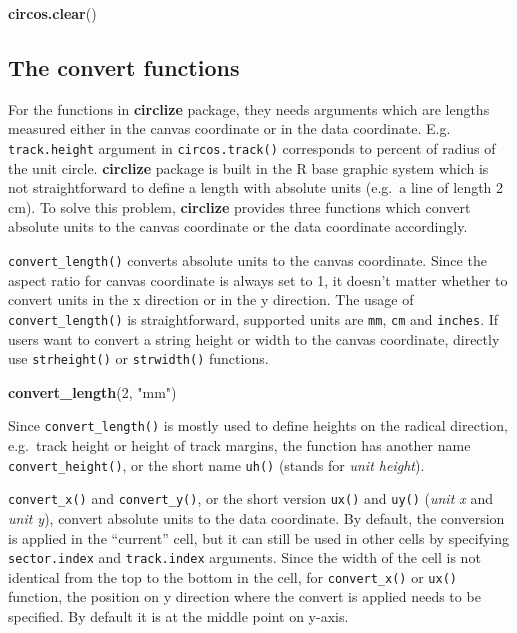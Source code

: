 \documentclass[]{book}
\newenvironment{Shaded}{\begin{snugshade}}{\end{snugshade}}
\newcommand{\KeywordTok}[1]{\textcolor[rgb]{0.13,0.29,0.53}{\textbf{#1}}}
\newcommand{\DecValTok}[1]{\textcolor[rgb]{0.00,0.00,0.81}{#1}}
\newcommand{\StringTok}[1]{\textcolor[rgb]{0.31,0.60,0.02}{#1}}
\newcommand{\NormalTok}[1]{#1}
\theoremstyle{definition}
\theoremstyle{definition}
\theoremstyle{remark}
\begin{document}
\begin{Shaded}
\begin{Highlighting}[]
\KeywordTok{circos.clear}\NormalTok{()}
\end{Highlighting}
\end{Shaded}

\subsection{The convert functions}\label{convert-functions}

For the functions in \textbf{circlize} package, they needs arguments
which are lengths measured either in the canvas coordinate or in the
data coordinate. E.g. \texttt{track.height} argument in
\texttt{circos.track()} corresponds to percent of radius of the unit
circle. \textbf{circlize} package is built in the R base graphic system
which is not straightforward to define a length with absolute units
(e.g.~a line of length 2 cm). To solve this problem, \textbf{circlize}
provides three functions which convert absolute units to the canvas
coordinate or the data coordinate accordingly.

\texttt{convert\_length()} converts absolute units to the canvas
coordinate. Since the aspect ratio for canvas coordinate is always set
to 1, it doesn't matter whether to convert units in the x direction or
in the y direction. The usage of \texttt{convert\_length()} is
straightforward, supported units are \texttt{mm}, \texttt{cm} and
\texttt{inches}. If users want to convert a string height or width to
the canvas coordinate, directly use \texttt{strheight()} or
\texttt{strwidth()} functions.

\begin{Shaded}
\begin{Highlighting}[]
\KeywordTok{convert_length}\NormalTok{(}\DecValTok{2}\NormalTok{, }\StringTok{"mm"}\NormalTok{)}
\end{Highlighting}
\end{Shaded}

Since \texttt{convert\_length()} is mostly used to define heights on the
radical direction, e.g.~track height or height of track margins, the
function has another name \texttt{convert\_height()}, or the short name
\texttt{uh()} (stands for \emph{unit height}).

\texttt{convert\_x()} and \texttt{convert\_y()}, or the short version
\texttt{ux()} and \texttt{uy()} (\emph{unit x} and \emph{unit y}),
convert absolute units to the data coordinate. By default, the
conversion is applied in the ``current'' cell, but it can still be used
in other cells by specifying \texttt{sector.index} and
\texttt{track.index} arguments. Since the width of the cell is not
identical from the top to the bottom in the cell, for
\texttt{convert\_x()} or \texttt{ux()} function, the position on y
direction where the convert is applied needs to be specified. By default
it is at the middle point on y-axis.
\end{document}
